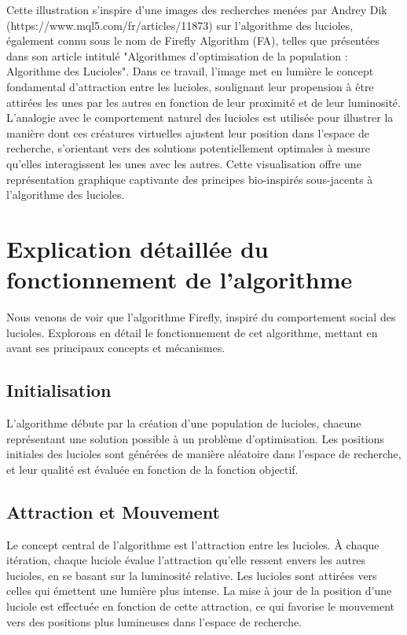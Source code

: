 \documentclass[conference]{IEEEtran}
\begin{document}
Cette illustration s'inspire d'une images des recherches menées par Andrey Dik (https://www.mql5.com/fr/articles/11873) sur l'algorithme des lucioles, également connu sous le nom de Firefly Algorithm (FA), telles que présentées dans son article intitulé "Algorithmes d'optimisation de la population : Algorithme des Lucioles". Dans ce travail, l'image met en lumière le concept fondamental d'attraction entre les lucioles, soulignant leur propension à être attirées les unes par les autres en fonction de leur proximité et de leur luminosité. L'analogie avec le comportement naturel des lucioles est utilisée pour illustrer la manière dont ces créatures virtuelles ajustent leur position dans l'espace de recherche, s'orientant vers des solutions potentiellement optimales à mesure qu'elles interagissent les unes avec les autres. Cette visualisation offre une représentation graphique captivante des principes bio-inspirés sous-jacents à l'algorithme des lucioles.

\section{Explication détaillée du fonctionnement de l'algorithme}

 Nous venons de voir que l'algorithme Firefly, inspiré du comportement social des lucioles. Explorons en détail le fonctionnement de cet algorithme, mettant en avant ses principaux concepts et mécanismes.

 \subsection{Initialisation}
 L'algorithme débute par la création d'une population de lucioles, chacune représentant une solution possible à un problème d'optimisation. Les positions initiales des lucioles sont générées de manière aléatoire dans l'espace de recherche, et leur qualité est évaluée en fonction de la fonction objectif.

 \subsection{Attraction et Mouvement}
 Le concept central de l'algorithme est l'attraction entre les lucioles. À chaque itération, chaque luciole évalue l'attraction qu'elle ressent envers les autres lucioles, en se basant sur la luminosité relative. Les lucioles sont attirées vers celles qui émettent une lumière plus intense. La mise à jour de la position d'une luciole est effectuée en fonction de cette attraction, ce qui favorise le mouvement vers des positions plus lumineuses dans l'espace de recherche.
\end{document}
